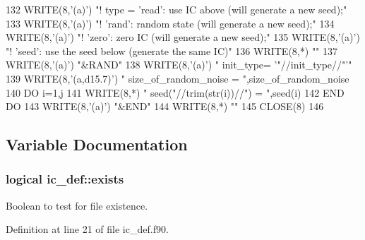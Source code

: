\begin{DoxyCode}
132     \textcolor{keyword}{WRITE}(8,\textcolor{stringliteral}{'(a)'}) \textcolor{stringliteral}{"! type = 'read': use IC above (will generate a new seed);"}
133     \textcolor{keyword}{WRITE}(8,\textcolor{stringliteral}{'(a)'}) \textcolor{stringliteral}{"!        'rand': random state (will generate a new seed);"}
134     \textcolor{keyword}{WRITE}(8,\textcolor{stringliteral}{'(a)'}) \textcolor{stringliteral}{"!        'zero': zero IC (will generate a new seed);"}
135     \textcolor{keyword}{WRITE}(8,\textcolor{stringliteral}{'(a)'}) \textcolor{stringliteral}{"!        'seed': use the seed below (generate the same IC)"}
136     \textcolor{keyword}{WRITE}(8,*) \textcolor{stringliteral}{""}
137     \textcolor{keyword}{WRITE}(8,\textcolor{stringliteral}{'(a)'}) \textcolor{stringliteral}{"&RAND"}
138     \textcolor{keyword}{WRITE}(8,\textcolor{stringliteral}{'(a)'}) \textcolor{stringliteral}{"  init\_type= '"}//init\_type//\textcolor{stringliteral}{"'"} 
139     \textcolor{keyword}{WRITE}(8,\textcolor{stringliteral}{'(a,d15.7)'}) \textcolor{stringliteral}{"  size\_of\_random\_noise = "},size\_of\_random\_noise
140     \textcolor{keywordflow}{DO} i=1,j
141        \textcolor{keyword}{WRITE}(8,*) \textcolor{stringliteral}{" seed("}//trim(str(i))//\textcolor{stringliteral}{") = "},seed(i)
142 \textcolor{keywordflow}{    END DO}
143     \textcolor{keyword}{WRITE}(8,\textcolor{stringliteral}{'(a)'}) \textcolor{stringliteral}{"&END"}
144     \textcolor{keyword}{WRITE}(8,*) \textcolor{stringliteral}{""}
145     \textcolor{keyword}{CLOSE}(8)
146     
\end{DoxyCode}


\subsection{Variable Documentation}
\subsubsection[{\texorpdfstring{exists}{exists}}]{\setlength{\rightskip}{0pt plus 5cm}logical ic\+\_\+def\+::exists\hspace{0.3cm}{\ttfamily [private]}}\hypertarget{namespaceic__def_a989b031664e87b1a693a329ecd4f4721}{}\label{namespaceic__def_a989b031664e87b1a693a329ecd4f4721}


Boolean to test for file existence. 



Definition at line 21 of file ic\+\_\+def.\+f90.


